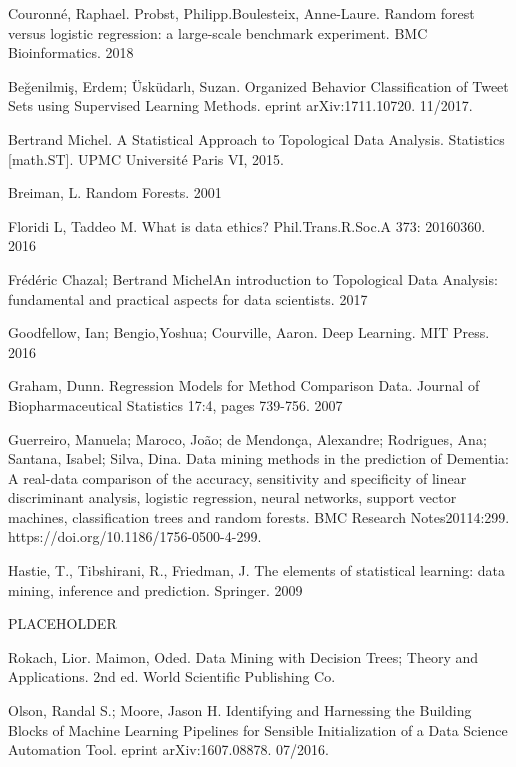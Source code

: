 \documentclass{llncs}
\begin{document}
\newpage
\begin{thebibliography}{19}

Couronné, Raphael. Probst, Philipp.Boulesteix, Anne-Laure. Random forest versus logistic regression: a large-scale benchmark experiment. BMC Bioinformatics. 2018

Beğenilmiş, Erdem; Üsküdarlı, Suzan.  Organized Behavior Classification of Tweet Sets using Supervised Learning Methods. eprint arXiv:1711.10720. 11/2017.

Bertrand Michel. A Statistical Approach to Topological Data Analysis. Statistics [math.ST]. UPMC Université Paris VI, 2015.

Breiman, L. Random Forests. 2001

Floridi L, Taddeo M.  What is data ethics? Phil.Trans.R.Soc.A 373: 20160360. 2016

Frédéric Chazal; Bertrand MichelAn introduction to Topological Data Analysis: fundamental and practical aspects for data scientists. 2017

Goodfellow, Ian; Bengio,Yoshua; Courville, Aaron. Deep Learning. MIT Press. 2016

Graham, Dunn. Regression Models for Method Comparison Data. Journal of Biopharmaceutical Statistics 17:4, pages 739-756. 2007

Guerreiro, Manuela; Maroco, João; de Mendonça, Alexandre; Rodrigues, Ana; Santana, Isabel; Silva, Dina. Data mining methods in the prediction of Dementia: A real-data comparison of the accuracy, sensitivity and specificity of linear discriminant analysis, logistic regression, neural networks, support vector machines, classification trees and random forests. BMC Research Notes20114:299. https://doi.org/10.1186/1756-0500-4-299.

Hastie, T., Tibshirani, R., Friedman, J. The elements of statistical learning: data mining, inference and prediction. Springer. 2009

PLACEHOLDER 

Rokach, Lior. Maimon, Oded. Data Mining with Decision Trees; Theory and Applications. 2nd ed. World Scientific Publishing Co. 

Olson, Randal S.; Moore, Jason H.  Identifying and Harnessing the Building Blocks of Machine Learning Pipelines for Sensible Initialization of a Data Science Automation Tool. eprint arXiv:1607.08878. 07/2016. 


\end{thebibliography}
\end{document}
